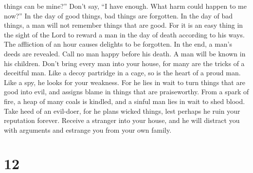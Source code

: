 things can be mine?''  Don't say, ``I have enough. What
harm could happen to me now?''  In the day of good
things, bad things are forgotten. In the day of bad things, a man will
not remember things that are good.  For it is an easy
thing in the sight of the Lord to reward a man in the day of death
according to his ways.  The affliction of an hour causes
delights to be forgotten. In the end, a man's deeds are revealed.
 Call no man happy before his death. A man will be known
in his children.  Don't bring every man into your house,
for many are the tricks of a deceitful man.  Like a decoy
partridge in a cage, so is the heart of a proud man. Like a spy, he
looks for your weakness.  For he lies in wait to turn
things that are good into evil, and assigns blame in things that are
praiseworthy.  From a spark of fire, a heap of many coals
is kindled, and a sinful man lies in wait to shed blood. 
Take heed of an evil-doer, for he plans wicked things, lest perhaps he
ruin your reputation forever.  Receive a stranger into
your house, and he will distract you with arguments and estrange you
from your own family.

\hypertarget{section-9}{%
\section{12}\label{section-9}}

